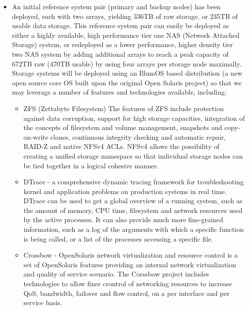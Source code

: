 \documentclass[arial,11pt]{article}
\begin{document}
\begin{enumerate}
\begin{itemize}
    \item An initial reference system pair (primary and backup nodes) has been deployed, each with two arrays, yielding 336TB of raw storage, or 235TB of usable data storage. This reference system pair can easily be deployed as either a highly available, high performance tier one NAS (Network Attached Storage) system, or redeployed as a lower performance, higher density tier two NAS system by adding additional arrays to reach a peak capacity of 672TB raw (470TB usable) by using four arrays per storage node maximally. Storage systems will be deployed using an IllumOS based distribution (a new open source core OS built upon the original Open Solaris project) so that we may leverage a number of features and technologies available, including:

    \begin{itemize}
        \item ZFS (Zettabyte Filesystem)  The features of ZFS include protection against data corruption, support for high storage capacities, integration of the concepts of filesystem and volume management, snapshots and copy-on-write clones, continuous integrity checking and automatic repair, RAID-Z and native NFSv4 ACLs. NFSv4 allows the possibility of creating a unified storage namespace so that individual storage nodes can be tied together in a logical cohesive manner.

        \item DTrace - a comprehensive dynamic tracing framework for troubleshooting kernel and application problems on production systems in real time. DTrace can be used to get a global overview of a running system, such as the amount of memory, CPU time, filesystem and network resources used by the active processes. It can also provide much more fine-grained information, such as a log of the arguments with which a specific function is being called, or a list of the processes accessing a specific file.

        \item Crossbow - OpenSolaris network virtualization and resource control is a set of OpenSolaris features providing an internal network virtualization and quality of service scenario. The Corssbow project includes technologies to allow finer crontrol of networking resources to increase QoS, bandwidth, failover and flow control, on a per interface and per service basis.
    \end{itemize}


\end{itemize}
\end{enumerate}
\end{document}
